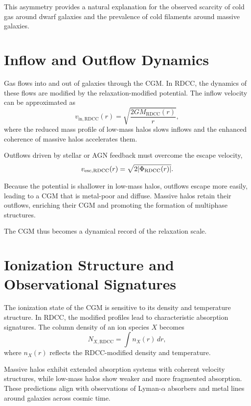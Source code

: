 \documentclass[11pt,a4paper]{article}
\begin{document}
This asymmetry provides a natural explanation for the observed scarcity of cold 
gas around dwarf galaxies and the prevalence of cold filaments around massive 
galaxies.
\section{Inflow and Outflow Dynamics}

Gas flows into and out of galaxies through the CGM. In RDCC, the dynamics of these 
flows are modified by the relaxation-modified potential. The inflow velocity can be 
approximated as
\begin{equation}
    v_{\mathrm{in,RDCC}}(r)
    = \sqrt{
        \frac{2 G M_{\mathrm{RDCC}}(r)}{r}
    },
\end{equation}
where the reduced mass profile of low-mass halos slows inflows and the enhanced 
coherence of massive halos accelerates them.

Outflows driven by stellar or AGN feedback must overcome the escape velocity,
\begin{equation}
    v_{\mathrm{esc,RDCC}}(r)
    = \sqrt{
        2 \abs{\Phi_{\mathrm{RDCC}}(r)}
    }.
\end{equation}

Because the potential is shallower in low-mass halos, outflows escape more easily, 
leading to a CGM that is metal-poor and diffuse. Massive halos retain their 
outflows, enriching their CGM and promoting the formation of multiphase structures.

The CGM thus becomes a dynamical record of the relaxation scale.
\section{Ionization Structure and Observational Signatures}

The ionization state of the CGM is sensitive to its density and temperature 
structure. In RDCC, the modified profiles lead to characteristic absorption 
signatures. The column density of an ion species $X$ becomes
\begin{equation}
    N_{X,\mathrm{RDCC}}
    = \int n_{X}(r)\,dr,
\end{equation}
where $n_{X}(r)$ reflects the RDCC-modified density and temperature.

Massive halos exhibit extended absorption systems with coherent velocity 
structures, while low-mass halos show weaker and more fragmented absorption. 
These predictions align with observations of Lyman-$\alpha$ absorbers and metal 
lines around galaxies across cosmic time.
\end{document}
